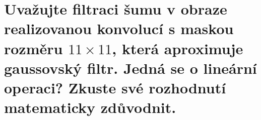 \section{Uvažujte filtraci šumu v obraze realizovanou konvolucí s maskou rozměru $11 \times 11$, která aproximuje 
gaussovský filtr. Jedná se o lineární operaci? Zkuste své rozhodnutí matematicky zdůvodnit.}